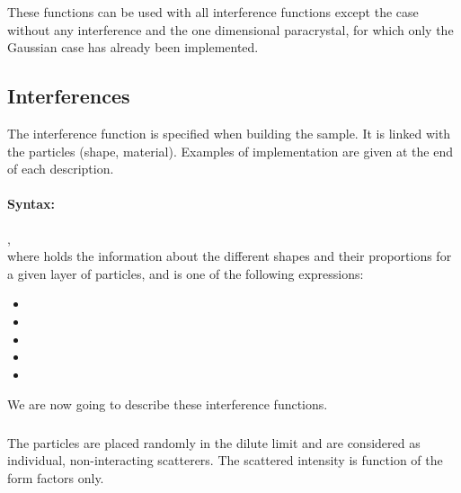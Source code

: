 These functions can be used with all interference functions except the case without any interference and the one dimensional paracrystal, for which only the Gaussian case has already been implemented.
\subsection{Interferences}
The interference function is specified when building the sample. It is linked with the particles (shape, material). Examples of implementation are given at the end of each description.

\paragraph{Syntax:}
 ,\\ where  holds the information about the different shapes and their proportions for a given layer of particles, and   is one of the following expressions:
\begin{itemize}
\item {}
\item {}
\item {}
\item {}
\item {}
\end{itemize}
We are now going to describe these interference functions.\\



\newpage
\subsubsection{ } \label{paragraphnointerf}
The particles are placed randomly in the dilute limit and are considered as individual, non-interacting scatterers. The scattered intensity is function of the form factors only. 

